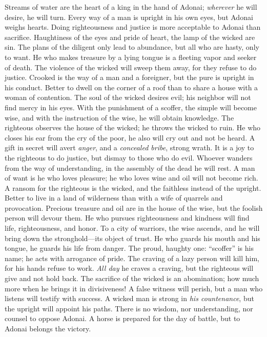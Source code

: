 \begin{biblechapter} %
\verse Streams of water are the heart of a king in the hand of Adonai; 
\textit{wherever} he will desire, he will turn.
\verse Every way of a man is upright in his own eyes, 
but Adonai weighs hearts.
\verse Doing righteousness and justice is more acceptable 
to Adonai than sacrifice.
\verse Haughtiness of the eyes and pride of heart, 
the lamp of the wicked are sin.
\verse The plans of the diligent only lead to abundance, 
but all who are hasty, only to want.
\verse He who makes treasure by a lying tongue 
is a fleeting vapor and seeker of death.
\verse The violence of the wicked will sweep them away, 
for they refuse to do justice.
\verse Crooked is the way of a man and a foreigner, 
but the pure is upright in his conduct.
\verse Better to dwell on the corner of a roof 
than to share a house with a woman of contention.
\verse The soul of the wicked desires evil; 
his neighbor will not find mercy in his eyes.
\verse With the punishment of a scoffer, the simple will become wise, 
and with the instruction of the wise, he will obtain knowledge.
\verse The righteous observes the house of the wicked; 
he throws the wicked to ruin.
\verse He who closes his ear from the cry of the poor, 
he also will cry out and not be heard.
\verse A gift in secret will avert \textit{anger}, 
and a \textit{concealed bribe}, strong wrath.
\verse It is a joy to the righteous to do justice, 
but dismay to those who do evil.
\verse Whoever wanders from the way of understanding, 
in the assembly of the dead he will rest.
\verse A man of want is he who loves pleasure; 
he who loves wine and oil will not become rich.
\verse A ransom for the righteous is the wicked, 
and the faithless instead of the upright.
\verse Better to live in a land of wilderness 
than with a wife of quarrels and provocation.
\verse Precious treasure and oil are in the house of the wise, 
but the foolish person will devour them.
\verse He who pursues righteousness and kindness 
will find life, righteousness, and honor.
\verse To a city of warriors, the wise ascends, 
and he will bring down the stronghold—its object of trust.
\verse He who guards his mouth and his tongue, 
he guards his life from danger.
\verse The proud, haughty one: “scoffer” is his name; 
he acts with arrogance of pride.
\verse The craving of a lazy person will kill him, 
for his hands refuse to work.
\verse \textit{All day} he craves a craving, 
but the righteous will give and not hold back.
\verse The sacrifice of the wicked is an abomination; 
how much more when he brings it in divisiveness!
\verse A false witness will perish, 
but a man who listens will testify with success.
\verse A wicked man is strong in \textit{his countenance}, 
but the upright will appoint his paths.
\verse There is no wisdom, nor understanding, 
nor counsel to oppose Adonai.
\verse A horse is prepared for the day of battle, 
but to Adonai belongs the victory.
\end{biblechapter}

